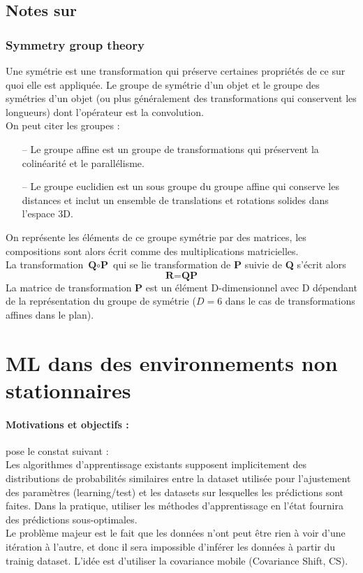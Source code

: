 \documentclass[a4paper,12pt]{report}
\newcommand\bk{\color{black}}
\newcommand\brick{\color{brick}}
\newcommand\navy{\color{navy}}
\numberwithin{equation}{section} %
\begin{document}
\section{Notes sur \citep{gens2014deep}}
\brick \subsection{Symmetry group theory} \bk
Une symétrie est une transformation qui préserve certaines propriétés de ce sur quoi elle est appliquée. Le groupe de symétrie d'un objet et le groupe des symétries d'un objet (ou plus généralement des transformations qui conservent les longueurs) dont l'opérateur est la convolution.\\
On peut citer les groupes : 
\begin{itemize}[leftmargin=2cm]
\item[--] Le groupe affine est un groupe de transformations qui préservent la colinéarité et le parallélisme. 
\item[--] Le groupe euclidien est un sous groupe du groupe affine qui conserve les distances et inclut un ensemble de translations et rotations solides dans l'espace 3D.
\end{itemize}
On représente les éléments de ce groupe symétrie par des matrices, les compositions sont alors écrit comme des multiplications matricielles.\\
La transformation $\textbf{Q} \circ \textbf{P}$ qui se lie transformation de \textbf{P} suivie de \textbf{Q} s'écrit alors 
\begin{equation*}
\textbf{R} = \textbf{QP}
\end{equation*}
La matrice de transformation \textbf{P} est un élément D-dimensionnel avec D dépendant de la représentation du groupe de symétrie ($D=6$ dans le cas de transformations affines dans le plan).


\newpage

\navy \chapter{ML dans des environnements non stationnaires} \bk
\subsubsection*{Motivations et objectifs :}
\noindent \cite{sugiyama2012machine} pose le constat suivant : \\
Les algorithmes d'apprentissage existants supposent implicitement des distributions  de probabilités similaires entre la dataset utilisée pour l'ajustement des paramètres (learning/test) et les datasets sur lesquelles les prédictions sont faites. Dans la pratique, utiliser les méthodes d'apprentissage en l'état fournira des prédictions sous-optimales.\\
Le problème majeur est le fait que les données n'ont peut être rien à voir d'une itération à l'autre, et donc il sera impossible d'inférer les données à partir du trainig dataset. L'idée est d'utiliser la covariance mobile (Covariance Shift, CS).\\
\end{document}

